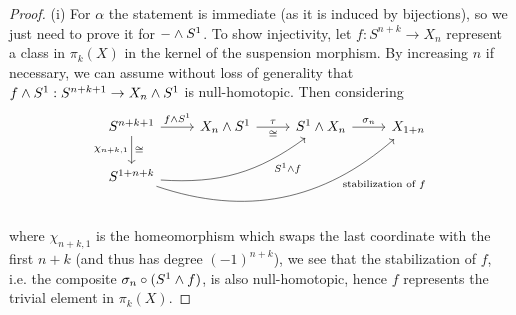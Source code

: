 \begin{proof}
(i) For $\alpha$ the statement is immediate (as it is induced by bijections), so we just need to prove it for $-\wedge S^1$. To show injectivity, let $f:S^{n+k}\to X_n$ represent a class in $\pi_k(X)$ in the kernel of the suspension morphism. By increasing $n$ if necessary, we can assume without loss of generality that $f\wedge S^1:S^{n+k+1}\to X_n\wedge S^1$ is null-homotopic. Then considering
\[
\begin{tikzcd}
S^{n+k+1} \ar[d,"\chi_{n+k,1}"',"\cong"] \ar[r,"f\smsh S^1"] & X_n\smsh S^1 \ar[r,"\tau","\cong"'] & S^1\smsh X_n \ar[r,"\sigma_n"] & X_{1+n}\\
S^{1+n+k} \ar[urr,bend right=20,"S^1\smsh f"' near end] \ar[urrr,bend right=30,"\text{stabilization of }f"' near end]
\end{tikzcd}
\]
where $\chi_{n+k,1}$ is the homeomorphism which swaps the last coordinate with the first $n+k$ (and thus has degree $(-1)^{n+k}$), we see that the stabilization of $f$, i.e. the composite $\sigma_n\circ(S^1\wedge f)$, is also null-homotopic, hence $f$ represents the trivial element in $\pi_k(X)$.


\end{proof}
